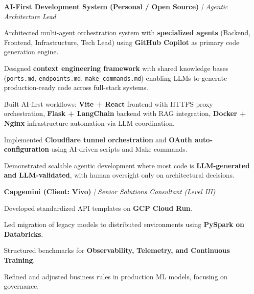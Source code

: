 \documentclass[]{deedy-resume-reversed}
\providecommand{\sectionsep}{\vspace{6pt}} %
\providecommand{\runsubsection}[1]{\vspace{2pt}\noindent\textbf{#1}}
\providecommand{\descript}[1]{\hfill\textit{#1}\par\vspace{-2pt}}
\begin{document}
\begin{minipage}[t]{0.62\textwidth}
\runsubsection{AI-First Development System (Personal / Open Source)}
\descript{| Agentic Architecture Lead}
\vspace{2mm}
\begin{tightemize}
\item Architected multi-agent orchestration system with \textbf{specialized agents} (Backend, Frontend, Infrastructure, Tech Lead) using \textbf{GitHub Copilot} as primary code generation engine.
\item Designed \textbf{context engineering framework} with shared knowledge bases (\texttt{ports.md}, \texttt{endpoints.md}, \texttt{make\_commands.md}) enabling LLMs to generate production-ready code across full-stack systems.
\item Built AI-first workflows: \textbf{Vite + React} frontend with HTTPS proxy orchestration, \textbf{Flask + LangChain} backend with RAG integration, \textbf{Docker + Nginx} infrastructure automation via LLM coordination.
\item Implemented \textbf{Cloudflare tunnel orchestration} and \textbf{OAuth auto-configuration} using AI-driven scripts and Make commands.
\item Demonstrated scalable agentic development where most code is \textbf{LLM-generated and LLM-validated}, with human oversight only on architectural decisions.
\end{tightemize}
\sectionsep

\runsubsection{Capgemini (Client: Vivo)}
\descript{| Senior Solutions Consultant (Level III)}
\vspace{2mm}
\begin{tightemize}
\item Developed standardized API templates on \textbf{GCP Cloud Run}.
\item Led migration of legacy models to distributed environments using \textbf{PySpark on Databricks}.
\item Structured benchmarks for \textbf{Observability, Telemetry, and Continuous Training}.
\item Refined and adjusted business rules in production ML models, focusing on governance.
\end{tightemize}
\sectionsep


\end{minipage}
\end{document}
